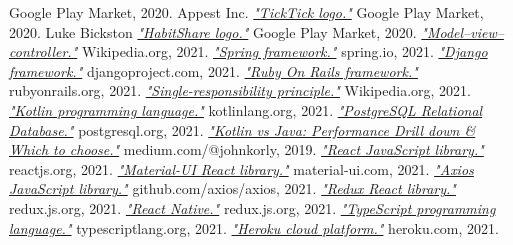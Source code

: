 \documentclass[twoside]{ctuthesis}
\begin{document}
\begin{thebibliography}{99}
        Google Play Market, 2020.
        Appest Inc.
        \href{https://play.google.com/store/apps/details?id=com.ticktick.task}{\emph{"TickTick logo."}}
        Google Play Market, 2020.
        Luke Bickston
        \href{https://play.google.com/store/apps/details?id=com.habitshareapp}{\emph{"HabitShare logo."}}
        Google Play Market, 2020.
        \href{https://en.wikipedia.org/wiki/Model\%E2\%80\%93view\%E2\%80\%93controller}{\emph{"Model–view–controller."}}
        Wikipedia.org, 2021.
        \href{https://spring.io/}{\emph{"Spring framework."}}
        spring.io, 2021.
        \href{https://www.djangoproject.com/}{\emph{"Django framework."}}
        djangoproject.com, 2021.
        \href{https://spring.io/}{\emph{"Ruby On Rails framework."}}
        rubyonrails.org, 2021.
        \href{https://en.wikipedia.org/wiki/Single-responsibility_principle}{\emph{"Single-responsibility principle."}}
        Wikipedia.org, 2021.
        \href{https://kotlinlang.org/}{\emph{"Kotlin programming language."}}
        kotlinlang.org, 2021.
        \href{https://www.postgresql.org/}{\emph{"PostgreSQL Relational Database."}}
        postgresql.org, 2021.
        \href{https://medium.com/@johnkorly/kotlin-vs-java-performance-drill-down-which-to-choose-2514bdf91916}{\emph{"Kotlin vs Java: Performance Drill down \& Which to choose."}}
        medium.com/@johnkorly, 2019.
        \href{https://reactjs.org/}{\emph{"React JavaScript library."}}
        reactjs.org, 2021.
        \href{https://material-ui.com/}{\emph{"Material-UI React library."}}
        material-ui.com, 2021.
        \href{https://github.com/axios/axios}{\emph{"Axios JavaScript library."}}
        github.com/axios/axios, 2021.
        \href{https://redux.js.org/}{\emph{"Redux React library."}}
        redux.js.org, 2021.
        \href{https://reactnative.dev/}{\emph{"React Native."}}
        redux.js.org, 2021.
        \href{https://www.typescriptlang.org/}{\emph{"TypeScript programming language."}}
        typescriptlang.org, 2021.
        \href{https://www.heroku.com/}{\emph{"Heroku cloud platform."}}
        heroku.com, 2021.

\end{thebibliography}
\end{document}
